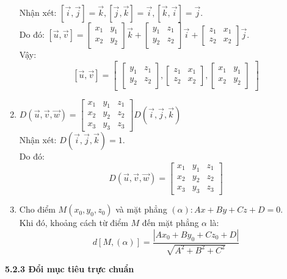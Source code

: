 \documentclass[12pt,a4]{article}
\begin{document}
\begin{titlepage}
\begin{enumerate}
Nhận xét: $[\vec{i},\vec{j}] = \vec{k}, [\vec{j},\vec{k}] = \vec{i}, [\vec{k},\vec{i}] = \vec{j}$.\\
Do đó: $[\vec{u}, \vec{v}] = \begin{bmatrix}x_1 &y_1\\x_2&y_2 \end{bmatrix}\vec{k} + \begin{bmatrix}y_1 &z_1\\y_2&z_2 \end{bmatrix}\vec{i} + \begin{bmatrix}z_1 &x_1\\z_2&x_2 \end{bmatrix}\vec{j}.$\\
Vậy: 
\[
[\vec{u},\vec{v}] = \begin{bmatrix} \begin{bmatrix} y_1&z_1\\y_2&z_2\end{bmatrix}, \begin{bmatrix} z_1&x_1\\z_2&x_2\end{bmatrix},\begin{bmatrix} x_1&y_1\\x_2&y_2\end{bmatrix} \end{bmatrix}
\]
\item $D(\vec{u},\vec{v},\vec{w}) = \begin{bmatrix} x_1&y_1&z_1\\x_2&y_2&z_2\\x_3&y_3&z_3\end{bmatrix}D(\vec{i},\vec{j},\vec{k})$\\
Nhận xét: $D(\vec{i},\vec{j},\vec{k}) = 1.$\\
Do đó:
\[
D(\vec{u},\vec{v},\vec{w}) = \begin{bmatrix}x_1&y_1&z_1\\x_2&y_2&z_2\\x_3&y_3&z_3 \end{bmatrix}
\]
\item Cho điểm $M(x_0,y_0,z_0)$ và mặt phẳng $(\alpha): Ax + By + Cz + D = 0.$\\
Khi đó, khoảng cách từ điểm $M$ đến mặt phẳng $\alpha$ là:
\[
d[M,(\alpha)] = \frac{|Ax_0 + By_0 + Cz_0 + D|}{\sqrt{A^2 + B^2 + C^2}}
\]
\end{enumerate}
\vspace{0.2cm}
\textbf{5.2.3 Đổi mục tiêu trực chuẩn}\\
\vspace{0.2cm}

\end{titlepage}
\end{document}
